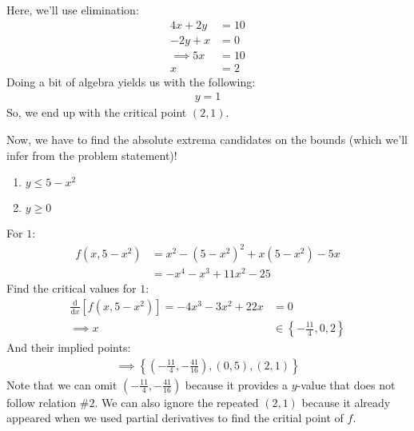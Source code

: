 Here, we'll use elimination:
\begin{align*}
	4x+2y&=10\\
	-2y+x&=0\\
	\implies 5x&=10\\
	x&=2
\end{align*}
Doing a bit of algebra yields us with the following:
\begin{align*}
	y=1
\end{align*}
So, we end up with the critical point $(2, 1)$.

Now, we have to find the absolute extrema candidates on the bounds (which we'll infer from the problem statement)!
\begin{enumerate}
	\item $y\leq 5-x^2$
	\item $y\geq 0$
\end{enumerate}

For $1$:
\begin{align*}
	f(x, 5-x^2) &= x^2-(5-x^2)^2+x(5-x^2)-5x\\
	&= -x^4-x^3+11x^2-25
\end{align*}
Find the critical values for $1$:
\begin{align*}
	\frac{\mathrm{d}}{\mathrm{d}x}[f(x, 5-x^2)] = -4x^3-3x^2+22x&=0\\
	\implies x&\in \left\{-\frac{11}{4}, 0, 2\right\}
\end{align*}
And their implied points:
\begin{align*}
	\implies \left\{\left(-\frac{11}{4}, -\frac{41}{16}\right), (0, 5), (2, 1)\right\}
\end{align*}
Note that we can omit $\left(-\frac{11}{4}, -\frac{41}{16}\right)$ because it provides a $y$-value that does not follow relation \#$2$.
We can also ignore the repeated $(2, 1)$ because it already appeared when we used partial derivatives to find the critial point of $f$.

